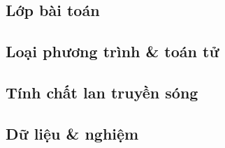 ﻿\subsection*{Lớp bài toán}


\medskip



\medskip



\bigskip

\subsection*{Loại phương trình \& toán tử}


\medskip



\medskip



\medskip



\medskip



\medskip



\bigskip

\subsection*{Tính chất lan truyền sóng}


\medskip



\medskip



\bigskip

\subsection*{Dữ liệu \& nghiệm}


